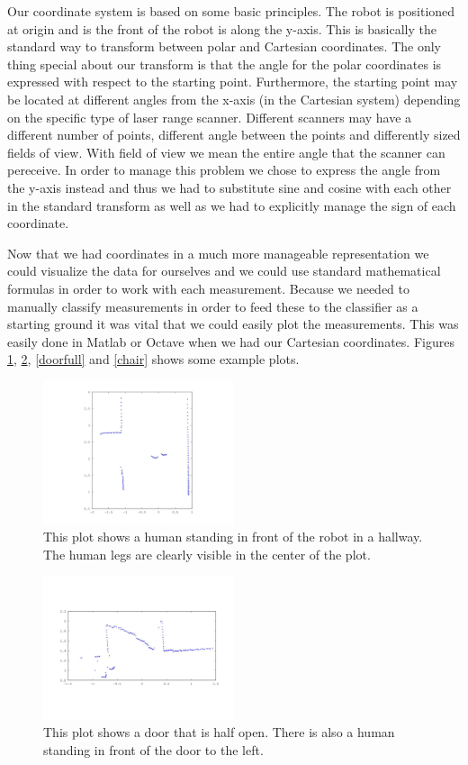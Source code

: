 \documentclass[a4paper, 10pt, conference]{ieeeconf}      %
\begin{document}
Our coordinate system is based on some basic principles. The robot is positioned at origin and is the front of the robot is along the y-axis. This is basically the standard way to transform between polar and Cartesian coordinates. The only thing special about our transform is that the angle for the polar coordinates is expressed with respect to the starting point. Furthermore, the starting point may be located at different angles from the x-axis (in the Cartesian system) depending on the specific type of laser range scanner. Different scanners may have a different number of points, different angle between the points and differently sized fields of view. With field of view we mean the entire angle that the scanner can pereceive. In order to manage this problem we chose to express the angle from the y-axis instead and thus we had to substitute sine and cosine with each other in the standard transform as well as we had to explicitly manage the sign of each coordinate.

Now that we had coordinates in a much more manageable representation we could visualize the data for ourselves and we could use standard mathematical formulas in order to work with each measurement. Because we needed to manually classify measurements in order to feed these to the classifier as a starting ground it was vital that we could easily plot the measurements. This was easily done in Matlab or Octave when we had our Cartesian coordinates. Figures \ref{human}, \ref{doorhalf}, \ref{doorfull} and \ref{chair} shows some example plots.


\begin{figure}
\centering
\includegraphics[width=0.5\textwidth]{presimg/human.jpg}
\caption{This plot shows a human standing in front of the robot in a hallway. The human legs are clearly visible in the center of the plot.}
\label{human}
\end{figure}

\begin{figure}
\centering
\includegraphics[width=0.5\textwidth]{presimg/doorhalf.jpg}
\caption{This plot shows a door that is half open. There is also a human standing in front of the door to the left.}
\label{doorhalf}
\end{figure}
\end{document}
